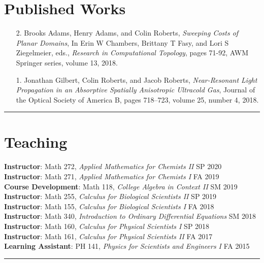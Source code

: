 \documentclass[12pt]{article} %
\begin{document}
\section{Published Works}
\begin{flushleft}
\begin{itemize}[leftmargin=*]
    \item[2.] Brooks Adams, Henry Adams, and Colin Roberts, \textit{Sweeping Costs of Planar Domains}, In Erin W Chambers, Brittany T Fasy, and Lori S Ziegelmeier, eds., \emph{Research in Computational Topology}, pages 71-92, AWM Springer series, volume 13, 2018.
    
    \item[1.] Jonathan Gilbert, Colin Roberts, and Jacob Roberts, \textit{Near-Resonant Light Propagation in an Absorptive Spatially Anisotropic Ultracold Gas}, Journal of the Optical Society of America B, pages 718–723, volume 25, number 4, 2018.
\end{itemize}
\end{flushleft}
\rule{\textwidth}{0.5mm}




\section{Teaching}
\begin{flushleft}
\textbf{Instructor}: Math 272, \emph{Applied Mathematics for Chemists II} \hfill SP 2020\\
\vspace*{5pt}
\textbf{Instructor}: Math 271, \emph{Applied Mathematics for Chemists I} \hfill FA 2019\\
\vspace*{5pt}
\textbf{Course Development}: Math 118, \emph{College Algebra in Context II} \hfill SM 2019\\
\vspace*{5pt}
\textbf{Instructor}: Math 255, \emph{Calculus for Biological Scientists II} \hfill SP 2019\\
\vspace*{5pt}
\textbf{Instructor}: Math 155, \emph{Calculus for Biological Scientists I} \hfill FA 2018\\
\vspace*{5pt}
\textbf{Instructor}: Math 340, \emph{Introduction to Ordinary Differential Equations} \hfill SM 2018\\
\vspace*{5pt}
\textbf{Instructor}: Math 160, \emph{Calculus for Physical Scientists I} \hfill SP 2018\\
\vspace*{5pt}
\textbf{Instructor}: Math 161, \emph{Calculus for Physical Scientists II} \hfill FA 2017\\
\vspace*{5pt}
\textbf{Learning Assistant}: PH 141, \emph{Physics for Scientists and Engineers I} \hfill FA 2015
\end{flushleft}
\rule{\textwidth}{0.5mm}
\end{document}
